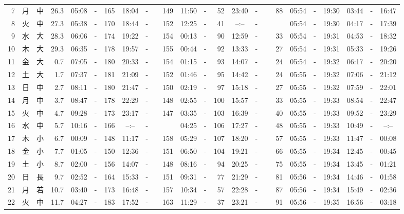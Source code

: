\documentclass[12pt,a4j]{jsarticle}
\begin{document}
\begin{table}[htbp]
\begin{center}
{\begin{tabular}{|rc|cr|ccrccr|ccrccr|ccc|ccc|}
 7 & 月 & 中 & 26.3 &  05:08 &-& 165 &  18:04 &-& 149 &  11:50 &-&  52 &  23:40 &-&  88 & 05:54 & -& 19:30 & 03:44 & -& 16:47 \\
 8 & 火 & 中 & 27.3 &  05:38 &-& 170 &  18:44 &-& 152 &  12:25 &-&  41 &  --:-- &-&~~~~~ & 05:54 & -& 19:30 & 04:17 & -& 17:39 \\
 9 & 水 & 大 & 28.3 &  06:06 &-& 174 &  19:22 &-& 154 &  00:13 &-&  90 &  12:59 &-&  33 & 05:54 & -& 19:31 & 04:53 & -& 18:32 \\
10 & 木 & 大 & 29.3 &  06:35 &-& 178 &  19:57 &-& 155 &  00:44 &-&  92 &  13:33 &-&  27 & 05:54 & -& 19:31 & 05:33 & -& 19:26 \\
11 & 金 & 大 &  0.7 &  07:05 &-& 180 &  20:33 &-& 154 &  01:15 &-&  93 &  14:07 &-&  24 & 05:54 & -& 19:32 & 06:17 & -& 20:20 \\
12 & 土 & 大 &  1.7 &  07:37 &-& 181 &  21:09 &-& 152 &  01:46 &-&  95 &  14:42 &-&  24 & 05:55 & -& 19:32 & 07:06 & -& 21:12 \\
13 & 日 & 中 &  2.7 &  08:11 &-& 180 &  21:47 &-& 150 &  02:19 &-&  97 &  15:18 &-&  27 & 05:55 & -& 19:32 & 07:59 & -& 22:01 \\
14 & 月 & 中 &  3.7 &  08:47 &-& 178 &  22:29 &-& 148 &  02:55 &-& 100 &  15:57 &-&  33 & 05:55 & -& 19:33 & 08:54 & -& 22:47 \\
15 & 火 & 中 &  4.7 &  09:28 &-& 173 &  23:17 &-& 147 &  03:35 &-& 103 &  16:39 &-&  40 & 05:55 & -& 19:33 & 09:52 & -& 23:29 \\
16 & 水 & 中 &  5.7 &  10:16 &-& 166 &  --:-- &-&~~~~~ &  04:25 &-& 106 &  17:27 &-&  48 & 05:55 & -& 19:33 & 10:49 & -& --:-- \\
17 & 木 & 小 &  6.7 &  00:09 &-& 148 &  11:17 &-& 158 &  05:29 &-& 107 &  18:20 &-&  57 & 05:55 & -& 19:33 & 11:47 & -& 00:08 \\
18 & 金 & 小 &  7.7 &  01:05 &-& 150 &  12:36 &-& 151 &  06:50 &-& 104 &  19:21 &-&  66 & 05:55 & -& 19:34 & 12:45 & -& 00:45 \\
19 & 土 & 小 &  8.7 &  02:00 &-& 156 &  14:07 &-& 148 &  08:16 &-&  94 &  20:25 &-&  75 & 05:55 & -& 19:34 & 13:45 & -& 01:21 \\
20 & 日 & 長 &  9.7 &  02:52 &-& 164 &  15:33 &-& 151 &  09:31 &-&  77 &  21:29 &-&  81 & 05:56 & -& 19:34 & 14:46 & -& 01:58 \\
21 & 月 & 若 & 10.7 &  03:40 &-& 173 &  16:48 &-& 157 &  10:34 &-&  57 &  22:28 &-&  87 & 05:56 & -& 19:34 & 15:49 & -& 02:36 \\
22 & 火 & 中 & 11.7 &  04:27 &-& 183 &  17:52 &-& 163 &  11:29 &-&  37 &  23:21 &-&  91 & 05:56 & -& 19:35 & 16:56 & -& 03:18 \\

\end{tabular}}
\end{center}
\end{table}
\end{document}
